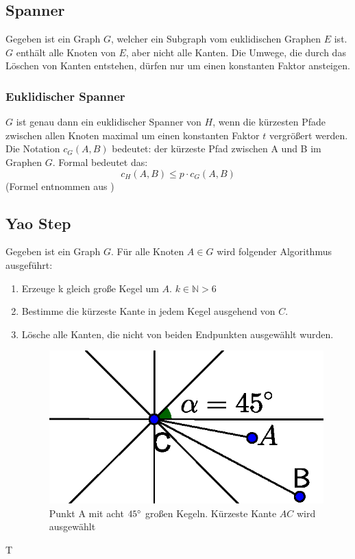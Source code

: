 \documentclass[a4paper,twoside]{IEEEtran}
\begin{document}
\subsection{Spanner}
Gegeben ist ein Graph $G $, welcher ein Subgraph vom euklidischen Graphen $E $ ist.
$G $ enthält alle Knoten von $E $, aber nicht alle Kanten. 
Die Umwege, die durch das Löschen von Kanten entstehen, dürfen nur um einen konstanten Faktor ansteigen. 

\subsubsection{Euklidischer Spanner}
$G $ ist genau dann ein euklidischer Spanner von $H $, wenn die kürzesten Pfade zwischen allen Knoten maximal um einen konstanten Faktor $t $ vergrößert werden.
Die Notation $c_{G}(A, B) $ bedeutet: der kürzeste Pfad zwischen A und B im Graphen $G $.
Formal bedeutet das:
\begin{equation}
	c_H(A, B) \leq p \cdot c_G(A, B)
\end{equation}
{\footnotesize (Formel entnommen aus \cite{kanj})}

\subsection{Yao Step}
Gegeben ist ein Graph $G $. Für alle Knoten $A \in G $ wird folgender Algorithmus ausgeführt:
\begin{enumerate}
\item Erzeuge k gleich große Kegel um $A $. $k \in \mathds{N} > 6 $
\item Bestimme die kürzeste Kante in jedem Kegel ausgehend von $C $.
\item Lösche alle Kanten, die nicht von beiden Endpunkten ausgewählt wurden.

\begin{figure}
\centering
\includegraphics[width=0.99\linewidth]{Yao_Step2.eps}
\caption{Punkt A mit acht $45\degree $ großen Kegeln. Kürzeste Kante $AC $ wird ausgewählt}
\label{fig:YaoStep2}
\end{figure}

\end{enumerate} T
\end{document}
